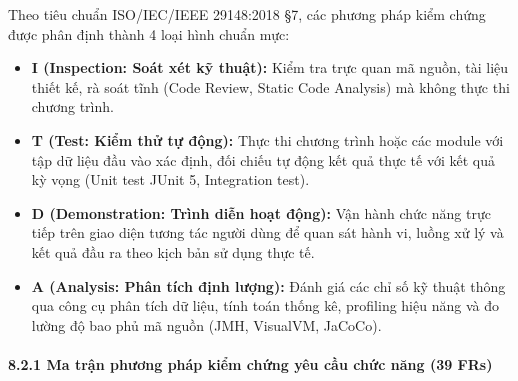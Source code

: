 \documentclass[11pt,a4paper]{article}
\providecommand{\tightlist}{
  \setlength{\itemsep}{0pt}\setlength{\parskip}{0pt}}
\begin{document}
Theo tiêu chuẩn ISO/IEC/IEEE 29148:2018 §7, các phương pháp kiểm chứng
được phân định thành 4 loại hình chuẩn mực:

\begin{itemize}
\tightlist
\item
  \textbf{I (Inspection: Soát xét kỹ thuật):} Kiểm tra trực quan mã
  nguồn, tài liệu thiết kế, rà soát tĩnh (Code Review, Static Code
  Analysis) mà không thực thi chương trình.
\item
  \textbf{T (Test: Kiểm thử tự động):} Thực thi chương trình hoặc các
  module với tập dữ liệu đầu vào xác định, đối chiếu tự động kết quả
  thực tế với kết quả kỳ vọng (Unit test JUnit 5, Integration test).
\item
  \textbf{D (Demonstration: Trình diễn hoạt động):} Vận hành chức năng
  trực tiếp trên giao diện tương tác người dùng để quan sát hành vi,
  luồng xử lý và kết quả đầu ra theo kịch bản sử dụng thực tế.
\item
  \textbf{A (Analysis: Phân tích định lượng):} Đánh giá các chỉ số kỹ
  thuật thông qua công cụ phân tích dữ liệu, tính toán thống kê,
  profiling hiệu năng và đo lường độ bao phủ mã nguồn (JMH, VisualVM,
  JaCoCo).
\end{itemize}

\paragraph{8.2.1 Ma trận phương pháp kiểm chứng yêu cầu chức năng (39
FRs)}\label{821-ma-trux1eadn-phux1b0ux1a1ng-phuxe1p-kiux1ec3m-chux1ee9ng-yuxeau-cux1ea7u-chux1ee9c-nux103ng-39-frs}
\end{document}
